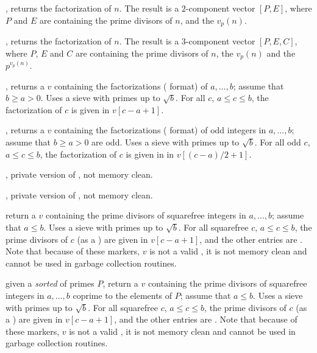 , returns the factorization of $n$. The result
is a $2$-component vector $[P,E]$, where $P$ and $E$ are 
containing the prime divisors of $n$, and the $v_p(n)$.

, returns the factorization of $n$. The result
is a $3$-component vector $[P,E,C]$, where $P$, $E$ and $C$ are
 containing the prime divisors of $n$, the $v_p(n)$
and the $p^{v_p(n)}$.

, returns a  $v$ containing
the factorizations ( format) of $a,\dots, b$; assume that $b
\geq a > 0$. Uses a sieve with primes up to $\sqrt{b}$. For all
$c$, $a \leq c \leq b$, the factorization of $c$ is given in $v[c-a+1]$.

, returns a  $v$ containing
the factorizations ( format) of odd integers in $a,\dots, b$;
assume that $b \geq a > 0$ are odd. Uses a sieve with primes up to
$\sqrt{b}$. For all odd $c$, $a \leq c \leq b$, the factorization of $c$ is
given in in $v[(c-a)/2 + 1]$.

, private version of
, not memory clean.

, private version of
, not memory clean.

 return a  $v$
containing the prime divisors of squarefree integers in $a,\dots,b$; assume
that $a \leq b$. Uses a sieve with primes up to $\sqrt{b}$.
For all squarefree $c$, $a\leq c\leq b$, the prime divisors of $c$ (as a
) are given in $v[c-a+1]$, and the other entries are
. Note that because of these  markers, $v$ is not a valid
, it is not memory clean and cannot be used in garbage collection
routines.

given a \emph{sorted}  of primes $P$, return a  $v$
containing the prime divisors of squarefree integers in $a,\dots,b$ coprime to
the elements of $P$; assume that $a \leq b$. Uses a sieve with primes up to
$\sqrt{b}$. For all squarefree $c$, $a\leq c\leq b$, the prime divisors of $c$
(as a ) are given in $v[c-a+1]$, and the other entries are
. Note that because of these  markers, $v$ is not a valid
, it is not memory clean and cannot be used in garbage collection
routines.

